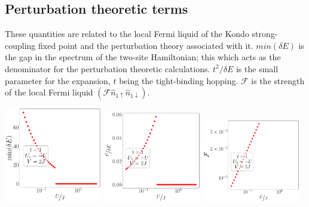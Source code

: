 \documentclass{report}
\numberwithin{equation}{section}
\begin{document}
\subsection*{Perturbation theoretic terms}
These quantities are related to the local Fermi liquid of the Kondo strong-coupling fixed point and the perturbation theory associated with it. \(min(\delta E)\) is the gap in the spectrum of the two-site Hamiltonian; this which acts as the denominator for the perturbation theoretic calculations. \(t^2/\delta E\) is the small parameter for the expansion, \(t\) being the tight-binding hopping. \(\mathcal{F}\) is the strength of the local Fermi liquid \((\mathcal{F} \hat n_{1 \uparrow} \hat n_{1 \downarrow})\).
\begin{center}
	\includegraphics[width=0.32\textwidth]{../figures/gap-t=1.000,J=31.623,0.000,50,V=2J,Ubath=-U,N=4,U=0.032,3.162,50.pdf}
	\includegraphics[width=0.32\textwidth]{../figures/par-t=1.000,J=31.623,0.000,50,V=2J,Ubath=-U,N=4,U=0.032,3.162,50.pdf}
	\includegraphics[width=0.32\textwidth]{../figures/lfl-t=1.000,J=31.623,0.000,50,V=2J,Ubath=-U,N=4,U=0.032,3.162,50.pdf}
\end{center}
\end{document}
